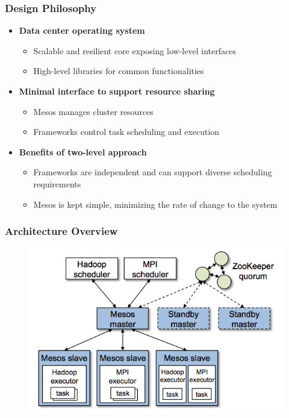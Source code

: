 \begin{frame}
\frametitle{Design Philosophy}
\begin{itemize}
	\item {\bf Data center operating system}
	\begin{itemize}
		\item Scalable and resilient core exposing low-level interfaces 
		\item High-level libraries for common functionalities
	\end{itemize}

	\item {\bf Minimal interface to support resource sharing}
	\begin{itemize}
		\item Mesos manages cluster resources
		\item Frameworks control task scheduling and execution
	\end{itemize}

	\item {\bf Benefits of two-level approach}
	\begin{itemize}
		\item Frameworks are independent and can support diverse scheduling requirements
		\item Mesos is kept simple, minimizing the rate of change to the system
	\end{itemize}
\end{itemize}
\end{frame}

\begin{frame}
\frametitle{Architecture Overview}
\begin{figure}[h]
  \centering
  \includegraphics[scale=0.6]{./figures/mesos_arch_overview}
  \label{fig:mesos_arch_overview}
\end{figure}
\end{frame}

